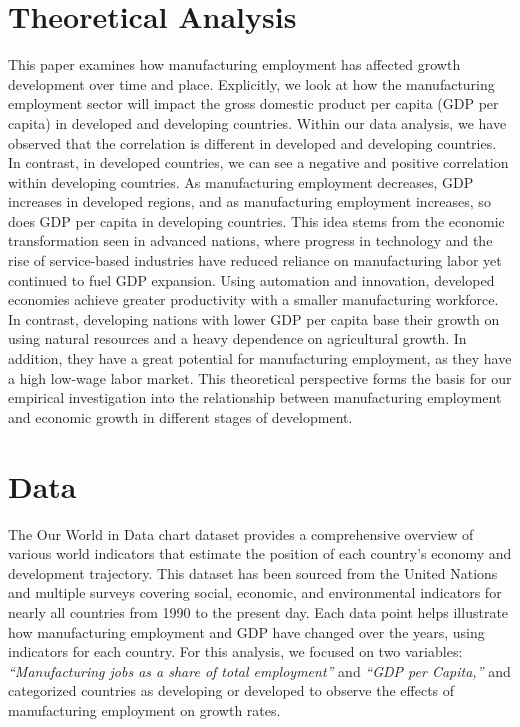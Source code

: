 \documentclass[12pt]{article}
\begin{document}
\section{Theoretical Analysis}
\label{sec:theory}
This paper examines how manufacturing employment has affected growth development over time and place. Explicitly, we look at how the manufacturing employment sector will impact the gross domestic product per capita (GDP per capita) in developed and developing countries. Within our data analysis, we have observed that the correlation is different in developed and developing countries. In contrast, in developed countries, we can see a negative and positive correlation within developing countries. As manufacturing employment decreases, GDP increases in developed regions, and as manufacturing employment increases, so does GDP per capita in developing countries. This idea stems from the economic transformation seen in advanced nations, where progress in technology and the rise of service-based industries have reduced reliance on manufacturing labor yet continued to fuel GDP expansion. Using automation and innovation, developed economies achieve greater productivity with a smaller manufacturing workforce. In contrast, developing nations with lower GDP per capita base their growth on using natural resources and a heavy dependence on agricultural growth. In addition, they have a great potential for manufacturing employment, as they have a high low-wage labor market. This theoretical perspective forms the basis for our empirical investigation into the relationship between manufacturing employment and economic growth in different stages of development.


\section{Data}
\label{sec:data}

The Our World in Data chart dataset provides a comprehensive overview of various world indicators that estimate the position of each country's economy and development trajectory. This dataset has been sourced from the United Nations and multiple surveys covering social, economic, and environmental indicators for nearly all countries from 1990 to the present day. Each data point helps illustrate how manufacturing employment and GDP have changed over the years, using indicators for each country. For this analysis, we focused on two variables: \textit{``Manufacturing jobs as a share of total employment''} and \textit{``GDP per Capita,''} and categorized countries as developing or developed to observe the effects of manufacturing employment on growth rates.
\end{document}
